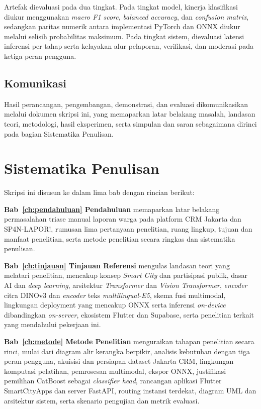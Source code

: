 Artefak dievaluasi pada dua tingkat. Pada tingkat model, kinerja klasifikasi diukur menggunakan \textit{macro F1 score}, \textit{balanced accuracy}, dan \textit{confusion matrix}, sedangkan paritas numerik antara implementasi PyTorch dan ONNX diukur melalui selisih probabilitas maksimum. Pada tingkat sistem, dievaluasi latensi inferensi per tahap serta kelayakan alur pelaporan, verifikasi, dan moderasi pada ketiga peran pengguna.

\subsection{Komunikasi}

Hasil perancangan, pengembangan, demonstrasi, dan evaluasi dikomunikasikan melalui dokumen skripsi ini, yang memaparkan latar belakang masalah, landasan teori, metodologi, hasil eksperimen, serta simpulan dan saran sebagaimana dirinci pada bagian Sistematika Penulisan.

\section{Sistematika Penulisan}

Skripsi ini disusun ke dalam lima bab dengan rincian berikut:

\textbf{Bab~\ref{ch:pendahuluan} Pendahuluan} memaparkan latar belakang permasalahan triase manual laporan warga pada platform CRM Jakarta dan SP4N-LAPOR!, rumusan lima pertanyaan penelitian, ruang lingkup, tujuan dan manfaat penelitian, serta metode penelitian secara ringkas dan sistematika penulisan.

\textbf{Bab~\ref{ch:tinjauan} Tinjauan Referensi} mengulas landasan teori yang melatari penelitian, mencakup konsep \textit{Smart City} dan partisipasi publik, dasar AI dan \textit{deep learning}, arsitektur \textit{Transformer} dan \textit{Vision Transformer}, \textit{encoder} citra DINOv3 dan \textit{encoder} teks \textit{multilingual-E5}, skema fusi multimodal, lingkungan deployment yang mencakup ONNX serta inferensi \textit{on-device} dibandingkan \textit{on-server}, ekosistem Flutter dan Supabase, serta penelitian terkait yang mendahului pekerjaan ini.

\textbf{Bab~\ref{ch:metode} Metode Penelitian} menguraikan tahapan penelitian secara rinci, mulai dari diagram alir kerangka berpikir, analisis kebutuhan dengan tiga peran pengguna, akuisisi dan persiapan dataset Jakarta CRM, lingkungan komputasi pelatihan, pemrosesan multimodal, ekspor ONNX, justifikasi pemilihan CatBoost sebagai \textit{classifier head}, rancangan aplikasi Flutter SmartCityApps dan server FastAPI, routing instansi terdekat, diagram UML dan arsitektur sistem, serta skenario pengujian dan metrik evaluasi.

